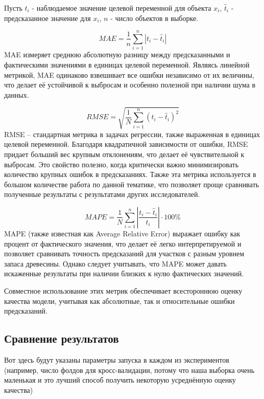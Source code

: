 \documentclass{article}
\begin{document}
Пусть $t_i$ - наблюдаемое значение целевой переменной для объекта $x_i$, $\hat{t}_i$ - предсказанное значение для $x_i$, $n$ - число объектов в выборке.

$$MAE = \frac{1}{n}\sum_{i = 1}^n|t_i - \hat{t}_i|$$
MAE измеряет среднюю абсолютную разницу между предсказанными и фактическими значениями в единицах целевой переменной. Являясь линейной метрикой, MAE одинаково взвешивает все ошибки независимо от их величины, что делает её устойчивой к выбросам и особенно полезной при наличии шума в данных.

$$RMSE  = \sqrt{\frac{1}{N}\sum_{i=1}^n(t_i - \hat{t}_i)^2}$$
RMSE – стандартная метрика в задачах регрессии, также выраженная в единицах целевой переменной. Благодаря квадратичной зависимости от ошибки, RMSE придает больший вес крупным отклонениям, что делает её чувствительной к выбросам. Это свойство полезно, когда критически важно минимизировать количество крупных ошибок в предсказаниях. Также эта метрика используется в большом количестве работа по данной тематике, что позволяет проще сравнивать полученные результаты с результатами других исследователей.

$$MAPE = \frac{1}{N}\sum_{i=1}^n \left| \frac{t_i - \hat{t}_i}{t_i} \right| \cdot 100 \%$$
MAPE (также известная как Average Relative Error) выражает ошибку как процент от фактического значения, что делает её легко интерпретируемой и позволяет сравнивать точность предсказаний для участков с разным уровнем запаса древесины. Однако следует учитывать, что MAPE может давать искаженные результаты при наличии близких к нулю фактических значений.

Совместное использование этих метрик обеспечивает всестороннюю оценку качества модели, учитывая как абсолютные, так и относительные ошибки предсказаний.

\subsection{Сравнение результатов}
Вот здесь будут указаны параметры запуска в каждом из экспериментов (например, число фолдов для кросс-валидации, потому что наша выборка очень маленькая и это лучший способ получить некоторую усреднённую оценку качества)
\end{document}
